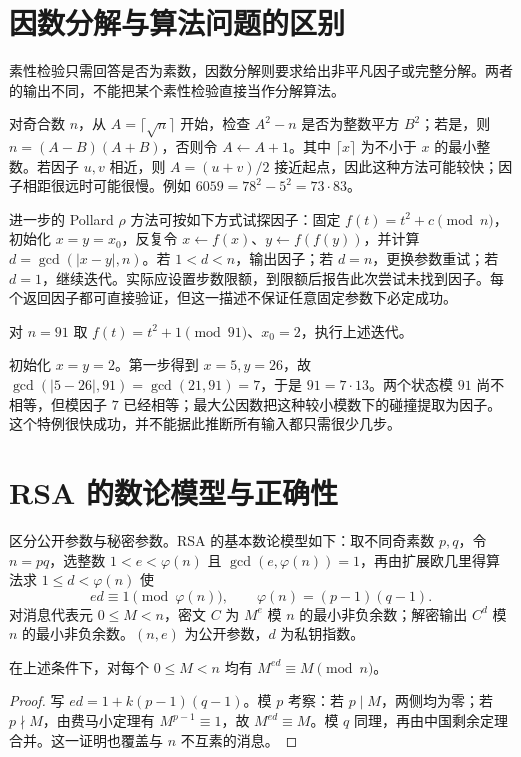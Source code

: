 \documentclass[UTF8,12pt,a4paper,fontset=fandol]{ctexbook}
\begin{document}
\section{因数分解与算法问题的区别}

素性检验只需回答是否为素数，因数分解则要求给出非平凡因子或完整分解。两者的输出不同，不能把某个素性检验直接当作分解算法。

对奇合数 $n$，从 $A=\lceil\sqrt n\rceil$ 开始，检查 $A^2-n$ 是否为整数平方 $B^2$；若是，则 $n=(A-B)(A+B)$，否则令 $A\leftarrow A+1$。其中 $\lceil x\rceil$ 为不小于 $x$ 的最小整数。若因子 $u,v$ 相近，则 $A=(u+v)/2$ 接近起点，因此这种方法可能较快；因子相距很远时可能很慢。例如 $6059=78^2-5^2=73\cdot83$。

进一步的 Pollard $\rho$ 方法可按如下方式试探因子：固定 $f(t)=t^2+c\pmod n$，初始化 $x=y=x_0$，反复令 $x\leftarrow f(x)$、$y\leftarrow f(f(y))$，并计算 $d=\gcd(|x-y|,n)$。若 $1<d<n$，输出因子；若 $d=n$，更换参数重试；若 $d=1$，继续迭代。实际应设置步数限额，到限额后报告此次尝试未找到因子。每个返回因子都可直接验证，但这一描述不保证任意固定参数下必定成功。

\begin{example}[观察一次因数分解迭代]
对 $n=91$ 取 $f(t)=t^2+1\pmod{91}$、$x_0=2$，执行上述迭代。
\end{example}
\begin{solve}
初始化 $x=y=2$。第一步得到 $x=5,y=26$，故 $\gcd(|5-26|,91)=\gcd(21,91)=7$，于是 $91=7\cdot13$。两个状态模 $91$ 尚不相等，但模因子 $7$ 已经相等；最大公因数把这种较小模数下的碰撞提取为因子。这个特例很快成功，并不能据此推断所有输入都只需很少几步。
\end{solve}

\section{RSA 的数论模型与正确性}

区分公开参数与秘密参数。RSA 的基本数论模型如下：取不同奇素数 $p,q$，令 $n=pq$，选整数 $1<e<\varphi(n)$ 且 $\gcd(e,\varphi(n))=1$，再由扩展欧几里得算法求 $1\le d<\varphi(n)$ 使
\[
 ed\equiv1\pmod{\varphi(n)},\qquad \varphi(n)=(p-1)(q-1).
\]
对消息代表元 $0\le M<n$，密文 $C$ 为 $M^e$ 模 $n$ 的最小非负余数；解密输出 $C^d$ 模 $n$ 的最小非负余数。$(n,e)$ 为公开参数，$d$ 为私钥指数。

\begin{proposition}
\label{prop:rsa-correctness}
在上述条件下，对每个 $0\le M<n$ 均有 $M^{ed}\equiv M\pmod n$。
\end{proposition}
\begin{proof}
写 $ed=1+k(p-1)(q-1)$。模 $p$ 考察：若 $p\mid M$，两侧均为零；若 $p\nmid M$，由费马小定理有 $M^{p-1}\equiv1$，故 $M^{ed}\equiv M$。模 $q$ 同理，再由中国剩余定理合并。这一证明也覆盖与 $n$ 不互素的消息。
\end{proof}
\end{document}
